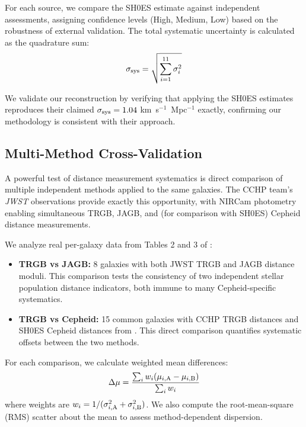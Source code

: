 \documentclass[twocolumn, linenumbers]{aastex701}
\begin{document}
For each source, we compare the SH0ES estimate against independent assessments, assigning confidence levels (High, Medium, Low) based on the robustness of external validation. The total systematic uncertainty is calculated as the quadrature sum:
\begin{equation}
\sigma_{\rm sys} = \sqrt{\sum_{i=1}^{11} \sigma_i^2}
\end{equation}

We validate our reconstruction by verifying that applying the SH0ES estimates reproduces their claimed $\sigma_{\rm sys} = 1.04$ km~s$^{-1}$~Mpc$^{-1}$ exactly, confirming our methodology is consistent with their approach.

\subsection{Multi-Method Cross-Validation} \label{sec:methods_crossval}

A powerful test of distance measurement systematics is direct comparison of multiple independent methods applied to the same galaxies. The CCHP team's \textit{JWST} observations \citep{Freedman2024} provide exactly this opportunity, with NIRCam photometry enabling simultaneous TRGB, JAGB, and (for comparison with SH0ES) Cepheid distance measurements.

We analyze real per-galaxy data from Tables 2 and 3 of \citet{Freedman2024}:

\begin{itemize}
\item \textbf{TRGB vs JAGB:} 8 galaxies with both JWST TRGB and JAGB distance moduli. This comparison tests the consistency of two independent stellar population distance indicators, both immune to many Cepheid-specific systematics.

\item \textbf{TRGB vs Cepheid:} 15 common galaxies with CCHP TRGB distances and SH0ES Cepheid distances from \citet{Riess2022}. This direct comparison quantifies systematic offsets between the two methods.
\end{itemize}

For each comparison, we calculate weighted mean differences:
\begin{equation}
\Delta\mu = \frac{\sum_i w_i (\mu_{i,\rm A} - \mu_{i,\rm B})}{\sum_i w_i}
\end{equation}
where weights are $w_i = 1/(\sigma_{i,\rm A}^2 + \sigma_{i,\rm B}^2)$. We also compute the root-mean-square (RMS) scatter about the mean to assess method-dependent dispersion.
\end{document}
